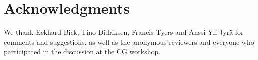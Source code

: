 \documentclass[11pt]{article}
\begin{document}
\section*{Acknowledgments}

We thank Eckhard Bick, Tino Didriksen, Francis Tyers and Anssi
Yli-Jyr{\"a} for comments and suggestions, as well as the anonymous
reviewers and everyone who participated in the discussion at the CG workshop.




\end{document}
